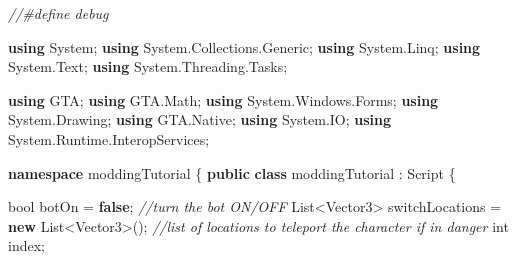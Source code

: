 \documentclass[
  openany]{book}
\newenvironment{Shaded}{\begin{snugshade}}{\end{snugshade}}
\newcommand{\CommentTok}[1]{\textcolor[rgb]{0.56,0.35,0.01}{\textit{#1}}}
\newcommand{\DataTypeTok}[1]{\textcolor[rgb]{0.13,0.29,0.53}{#1}}
\newcommand{\FunctionTok}[1]{\textcolor[rgb]{0.00,0.00,0.00}{#1}}
\newcommand{\KeywordTok}[1]{\textcolor[rgb]{0.13,0.29,0.53}{\textbf{#1}}}
\newcommand{\NormalTok}[1]{#1}
\begin{document}
\begin{Shaded}
\begin{Highlighting}[]
\CommentTok{//#define debug}


\KeywordTok{using}\NormalTok{ System;}
\KeywordTok{using}\NormalTok{ System.}\FunctionTok{Collections}\NormalTok{.}\FunctionTok{Generic}\NormalTok{;}
\KeywordTok{using}\NormalTok{ System.}\FunctionTok{Linq}\NormalTok{;}
\KeywordTok{using}\NormalTok{ System.}\FunctionTok{Text}\NormalTok{;}
\KeywordTok{using}\NormalTok{ System.}\FunctionTok{Threading}\NormalTok{.}\FunctionTok{Tasks}\NormalTok{;}

\KeywordTok{using}\NormalTok{ GTA;}
\KeywordTok{using}\NormalTok{ GTA.}\FunctionTok{Math}\NormalTok{;}
\KeywordTok{using}\NormalTok{ System.}\FunctionTok{Windows}\NormalTok{.}\FunctionTok{Forms}\NormalTok{;}
\KeywordTok{using}\NormalTok{ System.}\FunctionTok{Drawing}\NormalTok{;}
\KeywordTok{using}\NormalTok{ GTA.}\FunctionTok{Native}\NormalTok{;}
\KeywordTok{using}\NormalTok{ System.}\FunctionTok{IO}\NormalTok{;}
\KeywordTok{using}\NormalTok{ System.}\FunctionTok{Runtime}\NormalTok{.}\FunctionTok{InteropServices}\NormalTok{;}



\KeywordTok{namespace}\NormalTok{ moddingTutorial}
\NormalTok{\{}
    \KeywordTok{public} \KeywordTok{class}\NormalTok{ moddingTutorial : Script}
\NormalTok{    \{}

        \DataTypeTok{bool}\NormalTok{ botOn = }\KeywordTok{false}\NormalTok{; }\CommentTok{//turn the bot ON/OFF}
\NormalTok{        List<Vector3> switchLocations = }\KeywordTok{new}\NormalTok{ List<Vector3>(); }\CommentTok{//list of locations to teleport the character if in danger}
        \DataTypeTok{int}\NormalTok{ index;}


\end{Highlighting}
\end{Shaded}
\end{document}
